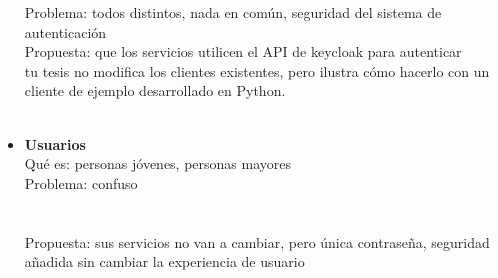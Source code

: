 \begin{itemize}
	Problema: todos distintos, nada en común, seguridad del sistema de autenticación\\
	Propuesta: que los servicios utilicen el API de keycloak para autenticar\\
	tu tesis no modifica los clientes existentes, pero ilustra cómo hacerlo con un cliente de ejemplo desarrollado en Python.\\
	\\
	\item \textbf{Usuarios}\\
	Qué es: personas jóvenes, personas mayores\\
	Problema: confuso\\
	\\
	\textcolor{red}{}
	\\
	Propuesta: sus servicios no van a cambiar, pero única contraseña, seguridad añadida sin cambiar la experiencia de usuario
	
\end{itemize} 

